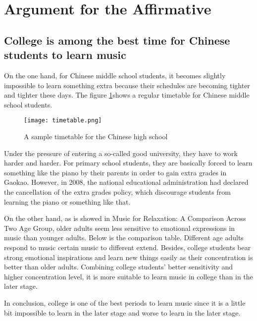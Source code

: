 \section{Argument for the Affirmative}
\subsection{College is among the best time for Chinese students to learn music}
On the one hand, for Chinese middle school students, it becomes slightly impossible to learn something extra because their schedules are becoming tighter and tighter these days. The figure \ref{Timetable}shows a regular timetable for Chinese middle school students. \begin{figure}
\centering
\texttt{[image: timetable.png]}
\label{Timetable}
\caption{A sample timetable for the Chinese high school}
\end{figure}
Under the pressure of entering a so-called good university, they have to work harder and harder. For primary school students, they are basically forced to learn something like the piano by their parents in order to gain extra grades in Gaokao. However, in 2008, the national educational administration had declared the cancellation of the extra grades policy, which discourage students from learning the piano or something like that. \par
On the other hand, as is showed in Music for Relaxation: A Comparison Across Two Age Group, older adults seem less sensitive to emotional expressions in music than younger adults. Below is the comparison table. Different age adults respond to music certain music to different extend. Besides, college students bear strong emotional inspirations and learn new things easily as their concentration is better than older adults. Combining college students’ better sensitivity and higher concentration level, it is more suitable to learn music in college than in the later stage.\par
In conclusion, college is one of the best periods to learn music since it is a little bit impossible to learn in the later stage and worse to learn in the later stage.
